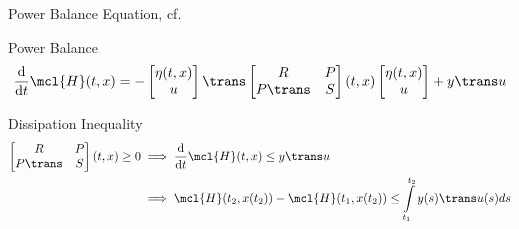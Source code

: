 {    \begin{frame}{Power Balance Equation, cf.~\cite[Section~6.1]{Mehrmann2022}}
        \begin{block}{Power Balance}
            \begin{equation*}
                \frac{\text{d}}{\text{d}t} \mcl{H}(t, x) = - \begin{bmatrix}
                    \eta(t, x) \\
                    u
                \end{bmatrix}\trans \begin{bmatrix}
                    R & P \\
                    P\trans & S
                \end{bmatrix}(t, x) \begin{bmatrix}
                    \eta(t, x) \\
                    u
                \end{bmatrix} + y\trans u
            \end{equation*}
        \end{block}

        \begin{block}{Dissipation Inequality}
            \begin{align*}
                \begin{bmatrix}
                    R & P \\
                    P\trans & S
                \end{bmatrix}(t, x) \geq 0 &\implies \frac{\text{d}}{\text{d}t} \mcl{H}(t, x) \leq y\trans u \\
                 &\implies \mcl{H}(t_2, x(t_2)) - \mcl{H}(t_1, x(t_2)) \leq \int\limits_{t_1}^{t_2} y(s)\trans u(s) ds
            \end{align*}
        \end{block}
    \end{frame}



}